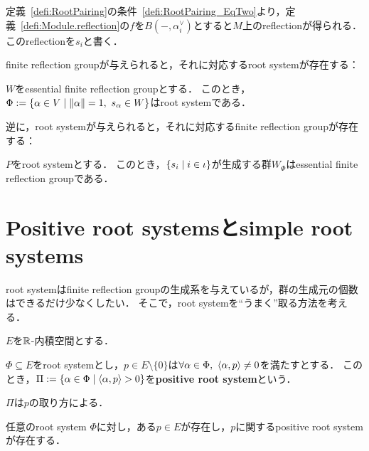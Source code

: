 \begin{definition}
  \label{defi:RootPairing.reflection}
  \leanok
  定義~\ref{defi:RootPairing}の条件~\ref{defi:RootPairing_EqTwo}より，定義~\ref{defi:Module.reflection}の$f$を$B(-, \alpha^\vee_i)$とすると$M$上のreflectionが得られる．
  このreflectionを$s_i$と書く．
\end{definition}

finite reflection groupが与えられると，それに対応するroot systemが存在する：

\begin{proposition}
  \label{prop:frg_to_root}
  \notready
  $W$をessential finite reflection groupとする．
  このとき，$\Phi := \set{\alpha \in V}{\norm{\alpha} = 1,\ s_\alpha \in W}$はroot systemである．
\end{proposition}

逆に，root systemが与えられると，それに対応するfinite reflection groupが存在する：
\begin{proposition}
  \label{prop:FiniteReflectionGroup.RootSystem_to_essFRG}
  $P$をroot systemとする．
  このとき，$\left\lbrace s_i \mathrel{} \middle| \mathrel{} i \in \iota \right\rbrace$が生成する群$W_\Phi$はessential finite reflection groupである．
\end{proposition}

\section{Positive root systemsとsimple root systems}
root systemはfinite reflection groupの生成系を与えているが，群の生成元の個数はできるだけ少なくしたい．
そこで，root systemを``うまく''取る方法を考える．

$E$を$\mathbb{R}$-内積空間とする．

\begin{definition}
  \label{defi:PositiveRootSystem}
  \leanok
  $\Phi \subseteq E$をroot systemとし，$p \in E \setminus \{0\}$は$\forall \alpha \in \Phi,\ \left\langle \alpha, p \right\rangle \ne 0$を満たすとする．
  このとき，$\Pi := \left\lbrace \alpha \in \Phi \mathrel{} \middle| \mathrel{} \left\langle \alpha, p \right\rangle > 0 \right\rbrace$を\textbf{positive root system}という．
\end{definition}

\begin{remark}
  $\Pi$は$p$の取り方による．
\end{remark}

\begin{theorem}
  \label{thm:RootPairing.exists_PositiveRootSystem}
  任意のroot system $\Phi$に対し，ある$p \in E$が存在し，$p$に関するpositive root systemが存在する．
\end{theorem}

